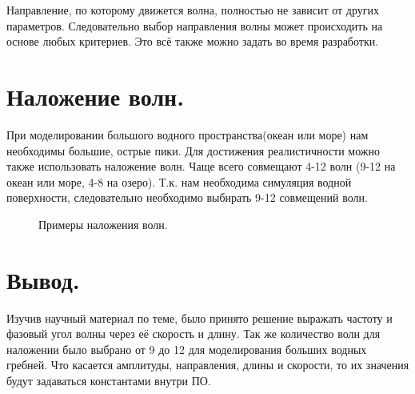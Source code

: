 Направление, по которому движется волна, полностью не зависит от других параметров. Следовательно выбор направления волны может происходить на основе любых критериев. Это всё также можно задать во время разработки.

\newpage
\section{Наложение волн.}

При моделировании большого водного пространства(океан или море) нам необходимы большие, острые пики. Для достижения реалистичности можно также использовать наложение волн. Чаще всего совмещают 4-12 волн (9-12 на океан или море, 4-8 на озеро). Т.к. нам необходима симуляция водной поверхности, следовательно необходимо выбирать 9-12 совмещений волн.

\begin{figure}[h]
	\caption{Примеры наложения волн.}
\end{figure}

\newpage
\section*{Вывод.}

Изучив научный материал по теме, было принято решение выражать частоту и фазовый угол волны через её скорость и длину. Так же количество волн для наложении было выбрано от 9 до 12 для моделирования больших водных гребней. Что касается амплитуды, направления, длины и скорости, то их значения будут задаваться константами внутри ПО. 
